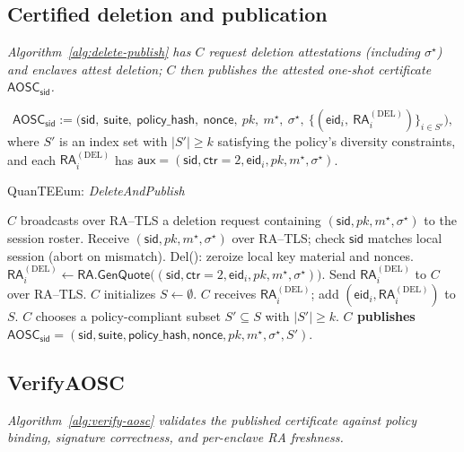 \documentclass[runningheads,orivec]{llncs}
\newcommand{\prot}{\textsf{QuanTEEum}}
\newcommand{\sid}{\mathsf{sid}}
\begin{document}
\FloatBarrier

\subsection{Certified deletion and publication}
\emph{Algorithm~\ref{alg:delete-publish} has $C$ request deletion attestations (including $\sigma^{\star}$) and enclaves attest deletion; $C$ then publishes the attested one-shot certificate $\mathsf{AOSC}_\sid$.}

\[
\mathsf{AOSC}_\sid := \big(\sid,\ \mathsf{suite},\ \mathsf{policy\_hash},\ \mathsf{nonce},\ pk,\ m^{\star},\ \sigma^{\star},\ \{(\mathsf{eid}_i,\ \mathsf{RA}^{(\mathrm{DEL})}_i)\}_{i\in S'}\big),
\]
where $S'$ is an index set with $|S'|\ge k$ satisfying the policy’s diversity constraints, and each
$\mathsf{RA}^{(\mathrm{DEL})}_i$ has $\mathsf{aux}=(\sid,\mathsf{ctr}{=}2,\mathsf{eid}_i,pk,m^{\star},\sigma^{\star})$.

\begin{algorithm}[H]
\caption{\prot{}: \emph{DeleteAndPublish}}
\label{alg:delete-publish}
\begin{small}
\begin{algorithmic}[1]
\State \textbf{$C$} broadcasts over RA--TLS a deletion request containing $(\sid,pk,m^{\star},\sigma^{\star})$ to the session roster.
  \State Receive $(\sid,pk,m^{\star},\sigma^{\star})$ over RA--TLS; check $\sid$ matches local session (abort on mismatch).
  \State \textsf{Del}(): zeroize local key material and nonces.
  \State $\mathsf{RA}^{(\mathrm{DEL})}_i \gets \textsf{RA.GenQuote}\big((\sid,\mathsf{ctr}{=}2,\mathsf{eid}_i,pk,m^{\star},\sigma^{\star})\big)$.
  \State Send $\mathsf{RA}^{(\mathrm{DEL})}_i$ to \textbf{$C$} over RA--TLS.
\EndFor
\State \textbf{$C$} initializes $S \gets \emptyset$.
  \State \textbf{$C$} receives $\mathsf{RA}^{(\mathrm{DEL})}_i$; add $(\mathsf{eid}_i,\mathsf{RA}^{(\mathrm{DEL})}_i)$ to $S$.
\EndFor
\State \textbf{$C$} chooses a policy-compliant subset $S' \subseteq S$ with $|S'|\ge k$.
\State \textbf{$C$ publishes} $\mathsf{AOSC}_\sid = (\sid,\mathsf{suite},\mathsf{policy\_hash},\mathsf{nonce},pk,m^{\star},\sigma^{\star},S')$.
\end{algorithmic}
\end{small}
\end{algorithm}

\FloatBarrier

\subsection{VerifyAOSC}
\emph{Algorithm~\ref{alg:verify-aosc} validates the published certificate against policy binding, signature correctness, and per-enclave RA freshness.}
\end{document}
